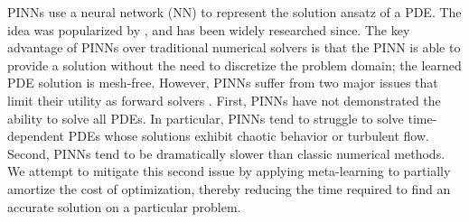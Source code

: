 
PINNs use a neural network (NN) to represent the solution ansatz of a PDE.
The idea was popularized by \citet{raissi2019physics}, and has been widely researched since.
The key advantage of PINNs over traditional numerical solvers is that the PINN is able to provide a solution without the need to discretize the problem domain; the learned PDE solution is mesh-free.
However, PINNs suffer from two major issues that limit their utility as forward solvers \citep{perdikaris2022respectingcausality}.
First, PINNs have not demonstrated the ability to solve all PDEs. In particular, PINNs tend to struggle to solve time-dependent PDEs whose solutions exhibit chaotic behavior or turbulent flow.
Second, PINNs tend to be dramatically slower than classic numerical methods.
We attempt to mitigate this second issue by applying meta-learning to partially amortize the cost of optimization, thereby reducing the time required to find an accurate solution on a particular problem.


